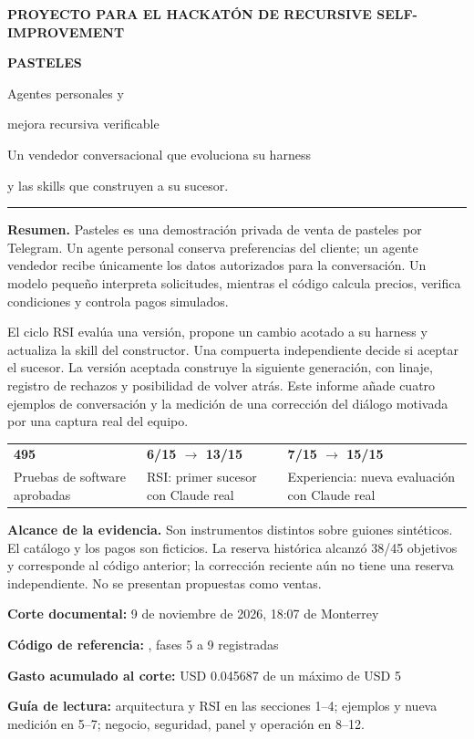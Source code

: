 \documentclass[11pt,a4paper]{article}
\newcommand{\code}[1]{\texttt{\detokenize{#1}}}
\newcommand{\eyebrow}[1]{{\sffamily\small\bfseries\color{teal}#1\par}}
\begin{document}
\thispagestyle{empty}
\eyebrow{PROYECTO PARA EL HACKATÓN DE RECURSIVE SELF-IMPROVEMENT}
\vspace{12mm}
{\sffamily\fontsize{44}{48}\selectfont\bfseries PASTELES\par}
\vspace{4mm}
{\sffamily\fontsize{23}{29}\selectfont Agentes personales y\par mejora recursiva verificable\par}
\vspace{6mm}
{\large Un vendedor conversacional que evoluciona su harness\par y las skills que construyen a su sucesor.\par}
\vspace{7mm}
\textcolor{teal}{\rule{\linewidth}{1.5pt}}\par
\vspace{5mm}
\textbf{Resumen.} Pasteles es una demostración privada de venta de pasteles por
Telegram. Un agente personal conserva preferencias del cliente; un agente
vendedor recibe únicamente los datos autorizados para la conversación. Un modelo
pequeño interpreta solicitudes, mientras el código calcula precios, verifica
condiciones y controla pagos simulados.

El ciclo RSI evalúa una versión, propone un cambio acotado a su harness y actualiza
la skill del constructor. Una compuerta independiente decide si aceptar el
sucesor. La versión aceptada construye la siguiente generación, con linaje,
registro de rechazos y posibilidad de volver atrás.
Este informe añade cuatro ejemplos de conversación y la medición de una
corrección del diálogo motivada por una captura real del equipo.
\vspace{4mm}
\begin{nota}
\begin{tabularx}{\linewidth}{@{}YYY@{}}
{\sffamily\Large\bfseries 495} & {\sffamily\Large\bfseries 6/15 $\to$ 13/15} & {\sffamily\Large\bfseries 7/15 $\to$ 15/15}\\[3pt]
Pruebas de software aprobadas & RSI: primer sucesor con Claude real & Experiencia: nueva evaluación con Claude real\\
\end{tabularx}
\end{nota}
\begin{limite}
\textbf{Alcance de la evidencia.} Son instrumentos distintos sobre guiones
sintéticos. El catálogo y los pagos son ficticios. La reserva histórica alcanzó
38/45 objetivos y corresponde al código anterior; la corrección reciente aún no
tiene una reserva independiente. No se presentan propuestas como ventas.
\end{limite}
\vfill
{\sffamily\small\textbf{Corte documental:} 9 de noviembre de 2026, 18:07 de Monterrey\par
\textbf{Código de referencia:} \code{a242a35}, fases 5 a 9 registradas\par
\textbf{Gasto acumulado al corte:} USD 0.045687 de un máximo de USD 5\par
\textbf{Guía de lectura:} arquitectura y RSI en las secciones 1--4;
ejemplos y nueva medición en 5--7; negocio, seguridad, panel y operación en 8--12.}
\end{document}

